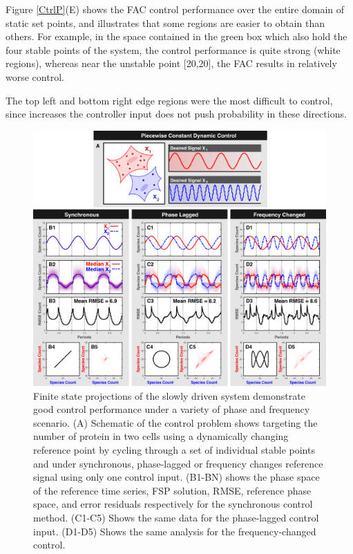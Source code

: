 \documentclass[12pt]{iopart}
\begin{document}
 

Figure \ref{CtrlP}(E) shows the FAC control performance over the entire domain of static set points, and illustrates that some regions are easier to obtain than others. For example, in the space contained in the green box which also hold the four stable points of the system, the control performance is quite strong (white regions), whereas near the unstable point [20,20], the FAC results in relatively worse control. 

The top left and bottom right edge regions were the most difficult to control, since increases the controller input does not push probability in these directions.  

\begin{figure}
\begin{center}
\includegraphics[width=1\textwidth]{DynamicControl.pdf}
\vspace{-0.1in}
\caption{Finite state projections of the slowly driven system demonstrate good control performance under a variety of phase and frequency scenario. (A) Schematic of the control problem shows targeting the number of protein in two cells using a dynamically changing reference point by cycling through a set of individual stable points and under synchronous, phase-lagged or frequency changes reference signal using only one control input. (B1-BN) shows the phase space of the reference time series, FSP solution, RMSE, reference phase space, and error residuals respectively for the synchronous control method. (C1-C5) Shows the same data for the phase-lagged control input. (D1-D5) Shows the same analysis for the frequency-changed control.}
\label{CR}
\end{center}
\vspace{-0.2in}
\end{figure}
\end{document}
